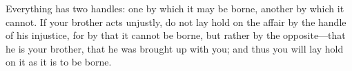 Everything has two handles:  one by which it may be borne,  another by which it
cannot. If  your brother acts unjustly,  do not lay  hold on the affair  by the
handle of  his injustice, for  by that  it cannot be  borne, but rather  by the
opposite---that he is your  brother, that he was brought up  with you; and thus
you will lay hold on it as it is to be borne.
